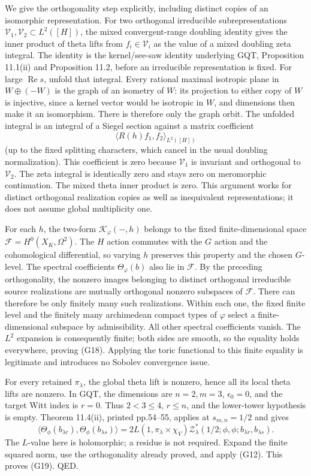 \documentclass[11pt,a4paper]{article}
\theoremstyle{definition}
\begin{document}
We give the orthogonality step explicitly, including distinct copies of an isomorphic representation. For two orthogonal irreducible subrepresentations \(\mathcal V_1,\mathcal V_2\subset L^2([H])\), the mixed convergent-range doubling identity gives the inner product of theta lifts from \(f_i\in\mathcal V_i\) as the value of a mixed doubling zeta integral. The identity is the kernel/see-saw identity underlying GQT, Proposition 11.1(ii) and Proposition 11.2, before an irreducible representation is fixed. For large \(\operatorname{Re}s\), unfold that integral. Every rational maximal isotropic plane in \(W\oplus(-W)\) is the graph of an isometry of \(W\): its projection to either copy of \(W\) is injective, since a kernel vector would be isotropic in \(W\), and dimensions then make it an isomorphism. There is therefore only the graph orbit. The unfolded integral is an integral of a Siegel section against a matrix coefficient \[
\langle R(h)f_1,f_2\rangle_{L^2([H])}
\] (up to the fixed splitting characters, which cancel in the usual doubling normalization). This coefficient is zero because \(\mathcal V_1\) is invariant and orthogonal to \(\mathcal V_2\). The zeta integral is identically zero and stays zero on meromorphic continuation. The mixed theta inner product is zero. This argument works for distinct orthogonal realization copies as well as inequivalent representations; it does not assume global multiplicity one.

For each \(h\), the two-form \(\mathcal K_\varphi(-,h)\) belongs to the fixed finite-dimensional space \(\mathcal F=H^0(X_K,\Omega^2)\). The \(H\) action commutes with the \(G\) action and the cohomological differential, so varying \(h\) preserves this property and the chosen \(G\)-level. The spectral coefficients \(\Theta_\varphi(b)\) also lie in \(\mathcal F\). By the preceding orthogonality, the nonzero images belonging to distinct orthogonal irreducible source realizations are mutually orthogonal nonzero subspaces of \(\mathcal F\). There can therefore be only finitely many such realizations. Within each one, the fixed finite level and the finitely many archimedean compact types of \(\varphi\) select a finite-dimensional subspace by admissibility. All other spectral coefficients vanish. The \(L^2\) expansion is consequently finite; both sides are smooth, so the equality holds everywhere, proving (G18). Applying the toric functional to this finite equality is legitimate and introduces no Sobolev convergence issue.

For every retained \(\pi_\lambda\), the global theta lift is nonzero, hence all its local theta lifts are nonzero. In GQT, the dimensions are \(n=2,m=3\), \(\epsilon_0=0\), and the target Witt index is \(r=0\). Thus \(2<3\le4\), \(r\le n\), and the lower-tower hypothesis is empty. Theorem 11.4(ii), printed pp.54--55, applies at \(s_{m,n}=1/2\) and gives \[
\langle\Theta_\phi(b_{\lambda r}),\Theta_\phi(b_{\lambda s})\rangle
=2L(1,\pi_\lambda\times\chi_V)
\mathcal Z^*_{\lambda}(1/2;\phi,\phi;b_{\lambda r},b_{\lambda s}).
\] The \(L\)-value here is holomorphic; a residue is not required. Expand the finite squared norm, use the orthogonality already proved, and apply (G12). This proves (G19). QED.
\end{document}
